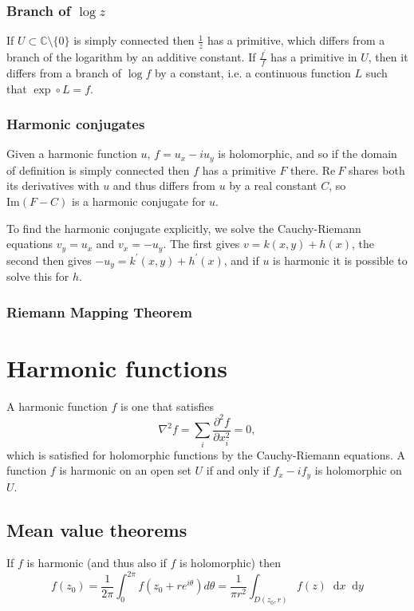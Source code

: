 \documentclass{article}
\newcommand\dif{\mathop{}\!\mathrm{d}}
\renewcommand{\Im}{\mathrm{Im}}
\renewcommand{\Re}{\mathrm{Re}}
\renewcommand{\Im}{\mathrm{Im}}
\begin{document}
\subsubsection{Branch of $\log z$}
If $U \subset \mathbb{C} \setminus \{ 0 \}$ is simply connected then
$\frac{1}{z}$ has a primitive, which differs from a branch of the
logarithm by an additive constant. If $\frac{f^\prime}{f}$ has a
primitive in $U$, then it differs from a branch of $\log f$ by a
constant, i.e. a continuous function $L$ such that
$\exp \circ L = f$.

\subsubsection{Harmonic conjugates}
Given a harmonic function $u$, $f = u_x - i u_y$ is holomorphic, and so if
the domain of definition is simply connected then $f$ has a primitive
$F$ there. $\Re~F$ shares both its derivatives
with $u$ and thus differs from $u$ by a real constant $C$, so
$\Im(F - C)$ is a harmonic conjugate for $u$.

To find the harmonic conjugate explicitly, we solve the
Cauchy-Riemann equations $v_y = u_x$ and $v_x = -u_y$. The first gives
$v = k(x, y) + h(x)$, the second then gives
$-u_y = k^\prime(x, y) + h^\prime(x)$, and if $u$ is harmonic it is
possible to solve this for $h$.

\subsubsection{Riemann Mapping Theorem}



\section{Harmonic functions}
A harmonic function $f$ is one that satisfies
$$
  \nabla^2 f
= \sum_i
    \frac{\partial^2 f}
         {\partial x_i^2}
= 0,
$$
which is satisfied for holomorphic functions by the Cauchy-Riemann
equations. A function $f$ is harmonic on an open set $U$
if and only if $f_x - i f_y$ is holomorphic on $U$.

\subsection{Mean value theorems}
If $f$ is harmonic (and thus also if $f$ is holomorphic) then
$$
  f(z_0)
= \frac{1}{2\pi}
  \int_{0}^{2\pi}
    f(z_0 + re^{i\theta})
    d \theta
= \frac{1}{\pi r^2}
  \int_{D(z_0, r)}
    f(z) \dif x \dif y
$$
\end{document}
